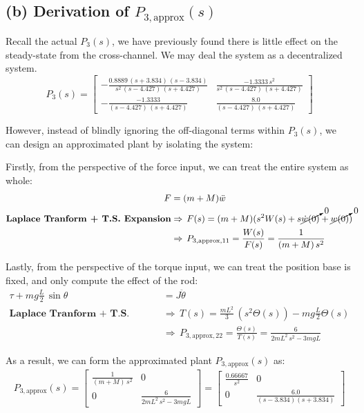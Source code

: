 \documentclass{tron}
\newcommand{\apx}{\text{approx}}
\begin{document}
\subsection{(b) Derivation of $P_{3, \apx}(s)$ \label{ans:P5-b}}
Recall the actual $P_3(s)$, we have previously found there is little effect on the steady-state from the cross-channel. We may deal the system as a decentralized system.
\begin{equation}
	P_{3}(s) = 
	\begin{bmatrix}
		-\frac{0.8889\,(s+3.834)\,(s-3.834)}{s^2\,(s-4.427)\,(s+4.427)} & \frac{-1.3333\,s^2}{s^2 \, (s-4.427)\,(s+4.427)} \\
		-\frac{-1.3333}{(s-4.427)\,(s+4.427)} & \frac{8.0}{(s-4.427)\,(s+4.427)}
	\end{bmatrix}
	\label{eqn:p5:p3-actual}
\end{equation}

However, instead of blindly ignoring the off-diagonal terms within $P_3(s)$, we can design an approximated plant by isolating the system:

Firstly, from the perspective of the force input, we can treat the entire system as whole:
\begin{align}
	F &= (m + M) \ddot{w} \\
	\textbf{Laplace Tranform + T.S. Expansion}  & \Rightarrow \, F(s) = (m + M)(s^2 W(s) + s \cancelto{0}{\dot{w}(0)} + \cancelto{0}{w(0)})  \\
	& \Rightarrow \, P_{3,\apx,11} = \frac{W(s)}{F(s)} = \frac{1}{(m + M) \, s^2}
\end{align}

Lastly, from the perspective of the torque input, we can treat the position base is fixed, and only compute the effect of the rod:
\begin{align}
	\tau + mg \frac{L}{2}\, \sin \theta &= J \ddot{\theta}\\
	\textbf{Laplace Tranform + T.S. Expansion}  & \Rightarrow \, T(s) = \frac{mL^2}{3}\,(s^2 \Theta(s)) - mg \frac{L}{2} \Theta(s) \\
	& \Rightarrow \, P_{3,\apx , 22} = \frac{\Theta(s)}{T(s)} = \frac{6}{ 2 mL^2\, s^2 - 3 mgL}
\end{align}

As a result, we can form the approximated plant $P_{3, \apx}(s)$ as:
\begin{align}
	P_{3, \apx}(s) = 
	\begin{bmatrix}
		\frac{1}{(m + M) \, s^2} & 0 \\
		0 & \frac{6}{ 2 mL^2\, s^2 - 3 mgL} 
	\end{bmatrix}
	= 
	\begin{bmatrix}
		\frac{0.66667}{s^2} & 0 \\
		0 & \frac{6.0}{(s-3.834)(s+3.834)}
	\end{bmatrix}	
	\label{eqn:p5:p3-approx}
\end{align}
\end{document}
